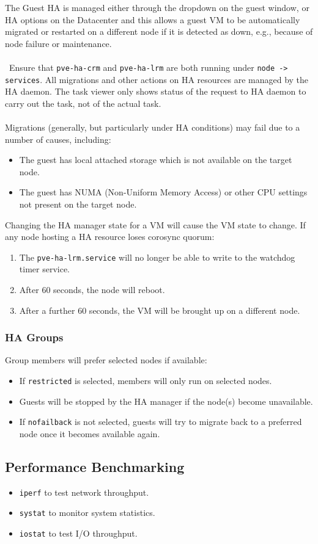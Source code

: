 \documentclass[a4paper,11pt]{article}
\begin{document}
The Guest HA is managed either through the dropdown on the guest window, or HA options on the Datacenter and this allows a guest VM to be automatically migrated or restarted on a different node if it is detected as down, e.g., because of node failure or maintenance.
\\\\\
Ensure that \verb|pve-ha-crm| and \verb|pve-ha-lrm| are both running under \verb|node -> services|.
All migrations and other actions on HA resources are managed by the HA daemon.
The task viewer only shows status of the request to HA daemon to carry out the task, not of the actual task.
\\\\
Migrations (generally, but particularly under HA conditions) may fail due to a number of causes, including:
\begin{itemize}
    \item   The guest has local attached storage which is not available on the target node.
    \item   The guest has NUMA (Non-Uniform Memory Access) or other CPU settings not present on the target node.
\end{itemize}

Changing the HA manager state for a VM will cause the VM state to change.
If any node hosting a HA resource loses corosync quorum:
\begin{enumerate}
    \item   The \verb|pve-ha-lrm.service| will no longer be able to write to the watchdog timer service.
    \item   After 60 seconds, the node will reboot.
    \item   After a further 60 seconds, the VM will be brought up on a different node.
\end{enumerate}

\subsubsection{HA Groups}
Group members will prefer selected nodes if available:
\begin{itemize}
    \item   If \verb|restricted| is selected, members will only run on selected nodes.
    \item   Guests will be stopped by the HA manager if the node(s) become unavailable.
    \item   If \verb|nofailback| is not selected, guests will try to migrate back to a preferred node once it becomes available again.
\end{itemize}

\subsection{Performance Benchmarking}
\begin{itemize}
    \item   \verb|iperf| to test network throughput.
    \item   \verb|systat| to monitor system statistics.
    \item   \verb|iostat| to test I/O throughput.
\end{itemize}
\end{document}
